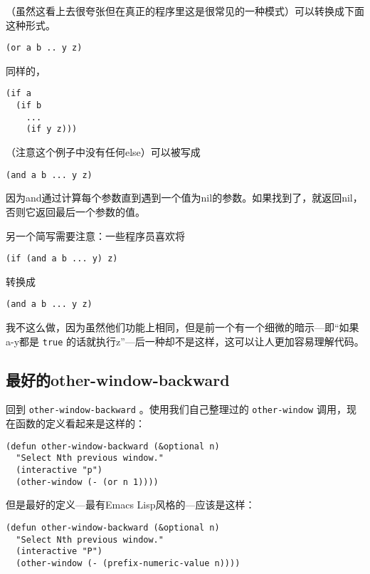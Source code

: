 （虽然这看上去很夸张但在真正的程序里这是很常见的一种模式）可以转换成下面这种形式。

\begin{verbatim}
(or a b .. y z)
\end{verbatim}

同样的，

\begin{verbatim}
(if a
  (if b
    ...
    (if y z)))
\end{verbatim}

（注意这个例子中没有任何else）可以被写成

\begin{verbatim}
(and a b ... y z)
\end{verbatim}

因为and通过计算每个参数直到遇到一个值为nil的参数。如果找到了，就返回nil，否则它返回最后一个参数的值。

另一个简写需要注意：一些程序员喜欢将

\begin{verbatim}
(if (and a b ... y) z)
\end{verbatim}

转换成

\begin{verbatim}
(and a b ... y z)
\end{verbatim}

我不这么做，因为虽然他们功能上相同，但是前一个有一个细微的暗示---即“如果a-y都是 \texttt{true} 的话就执行z”---后一种却不是这样，这可以让人更加容易理解代码。

\subsection{最好的other-window-backward}
\label{section:02-The-Best-other-window-backward}

回到 \texttt{other-window-backward} 。使用我们自己整理过的 \texttt{other-window} 调用，现在函数的定义看起来是这样的：

\begin{verbatim}
(defun other-window-backward (&optional n)
  "Select Nth previous window."
  (interactive "p")
  (other-window (- (or n 1))))
\end{verbatim}

但是最好的定义---最有Emacs Lisp风格的---应该是这样：

\begin{verbatim}
(defun other-window-backward (&optional n)
  "Select Nth previous window."
  (interactive "P")
  (other-window (- (prefix-numeric-value n))))
\end{verbatim}

